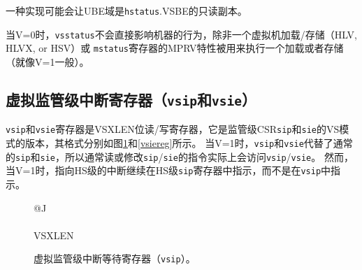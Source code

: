 一种实现可能会让UBE域是{\tt hstatus}.VSBE的只读副本。

当V=0时，{\tt vsstatus}不会直接影响机器的行为，除非一个虚拟机加载/存储（HLV, HLVX, or HSV）或
{\tt mstatus}寄存器的MPRV特性被用来执行一个加载或者存储（就像V=1一般）。

\subsection{虚拟监管级中断寄存器（{\tt vsip}和{\tt vsie}）}

{\tt vsip}和{\tt vsie}寄存器是VSXLEN位读/写寄存器，它是监管级CSR{\tt sip}和{\tt sie}的VS模式的版本，其格式分别如图\ref{vsipreg}和\ref{vsiereg}所示。
当V=1时，{\tt vsip}和{\tt vsie}代替了通常的{\tt sip}和{\tt sie}，所以通常读或修改{\tt sip}/{\tt sie}的指令实际上会访问{\tt vsip}/{\tt vsie}。
然而，当V=1时，指向HS级的中断继续在HS级{\tt sip}寄存器中指示，而不是在{\tt vsip}中指示。

\begin{figure}[h!]
{\footnotesize
\begin{center}
\begin{tabular}{@{}J}
 \\
\hline
{} \\
\hline
VSXLEN \\
\end{tabular}
\end{center}
}
\vspace{-0.1in}
\caption{虚拟监管级中断等待寄存器（{\tt vsip}）。
  }
\label{vsipreg}
\end{figure}

